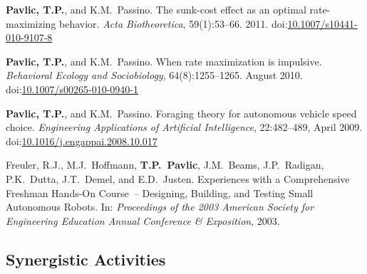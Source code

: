 \documentclass[a4paper,11pt]{article}
\newcommand\doilink[1]{\href{http://dx.doi.org/#1}{#1}}
\newcommand\doi[1]{doi:\doilink{#1}}
\begin{document}
\begin{bibenum}[itemsep=5pt]
    \item \textbf{Pavlic, T.P.}, and K.M.~Passino. The sunk-cost effect as an
        optimal rate-maximizing behavior. \emph{Acta Biotheoretica},
        59(1):53--66. 2011. \doi{10.1007/s10441-010-9107-8}

    \item \textbf{Pavlic, T.P.}, and K.M.~Passino. When rate maximization is
        impulsive. \emph{Behavioral Ecology and Sociobiology},
        64(8):1255--1265. August 2010. \doi{10.1007/s00265-010-0940-1}

    \item \textbf{Pavlic, T.P.}, and K.M.~Passino. Foraging theory for
        autonomous vehicle speed choice. \emph{Engineering Applications
        of Artificial Intelligence}, 22:482--489, April 2009.
        \doi{10.1016/j.engappai.2008.10.017}

    \item Freuler, R.J., M.J.~Hoffmann, \textbf{T.P.~Pavlic}, J.M.~Beams,
        J.P.~Radigan, P.K.~Dutta, J.T.~Demel, and E.D.~Justen.
        Experiences with a Comprehensive Freshman Hands-On Course~--
        Designing, Building, and Testing Small Autonomous Robots. In:
        \emph{Proceedings of the 2003 American Society for Engineering
        Education Annual Conference \& Exposition}, 2003.

\end{bibenum}

\subsection{Synergistic Activities}
\end{document}
